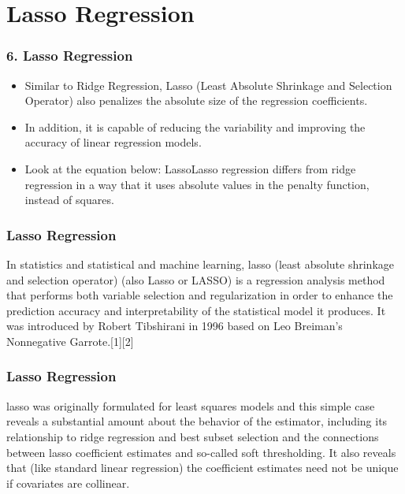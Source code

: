 \documentclass{beamer}
\begin{document}
\section{Lasso Regression}
\begin{frame}
	\frametitle{6. Lasso Regression}
	\begin{itemize}
\item Similar to Ridge Regression, Lasso (Least Absolute Shrinkage and Selection Operator) also penalizes the absolute size of the regression coefficients. 
\item In addition, it is capable of reducing the variability and improving the accuracy of linear regression models.  
\item Look at the equation below: LassoLasso regression differs from ridge regression in a way that it uses absolute values in the penalty function, instead of squares.
	\end{itemize}
	 
	
\end{frame}
\begin{frame}
	\frametitle{Lasso Regression}
	In statistics and statistical and machine learning, lasso (least absolute shrinkage and selection operator) (also Lasso or LASSO) is a regression analysis method that performs both variable selection and regularization in order to enhance the prediction accuracy and interpretability of the statistical model it produces. It was introduced by Robert Tibshirani in 1996 based on Leo Breiman’s Nonnegative Garrote.[1][2] 
	
\end{frame}
\begin{frame}
	\frametitle{Lasso Regression}
	lasso was originally formulated for least squares models and this simple case reveals a substantial amount about the behavior of the estimator, including its relationship to ridge regression and best subset selection and the connections between lasso coefficient estimates and so-called soft thresholding. It also reveals that (like standard linear regression) the coefficient estimates need not be unique if covariates are collinear.
\end{frame}
\end{document}
